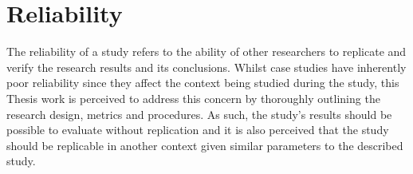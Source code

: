 \section{Reliability}
The reliability of a study refers to the ability of other researchers to replicate and verify the research results and its conclusions.
Whilst case studies have inherently poor reliability since they affect the context being studied during the study, this Thesis work is perceived to address this concern by thoroughly outlining the research design, metrics and procedures.
As such, the study's results should be possible to evaluate without replication and it is also perceived that the study should be replicable in another context given similar parameters to the described study.

